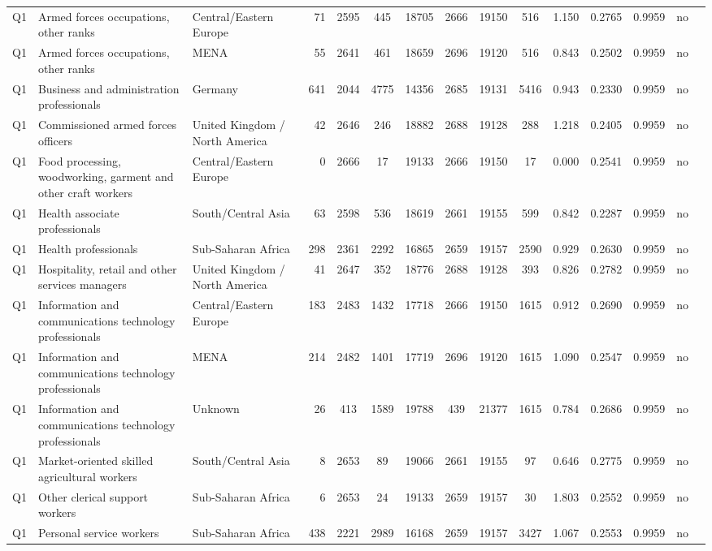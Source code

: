 \begin{longtable}{lllrcccccccccll}
Q1 & Armed forces occupations, other ranks & Central/Eastern Europe & 71 & 2595 & 445 & 18705 & 2666 & 19150 & 516 & 1.150 & 0.2765 & 0.9959 & no \\
Q1 & Armed forces occupations, other ranks & MENA & 55 & 2641 & 461 & 18659 & 2696 & 19120 & 516 & 0.843 & 0.2502 & 0.9959 & no \\
Q1 & Business and administration professionals & Germany & 641 & 2044 & 4775 & 14356 & 2685 & 19131 & 5416 & 0.943 & 0.2330 & 0.9959 & no \\
Q1 & Commissioned armed forces officers & United Kingdom / North America & 42 & 2646 & 246 & 18882 & 2688 & 19128 & 288 & 1.218 & 0.2405 & 0.9959 & no \\
Q1 & Food processing, woodworking, garment and other craft workers & Central/Eastern Europe & 0 & 2666 & 17 & 19133 & 2666 & 19150 & 17 & 0.000 & 0.2541 & 0.9959 & no \\
Q1 & Health associate professionals & South/Central Asia & 63 & 2598 & 536 & 18619 & 2661 & 19155 & 599 & 0.842 & 0.2287 & 0.9959 & no \\
Q1 & Health professionals & Sub-Saharan Africa & 298 & 2361 & 2292 & 16865 & 2659 & 19157 & 2590 & 0.929 & 0.2630 & 0.9959 & no \\
Q1 & Hospitality, retail and other services managers & United Kingdom / North America & 41 & 2647 & 352 & 18776 & 2688 & 19128 & 393 & 0.826 & 0.2782 & 0.9959 & no \\
Q1 & Information and communications technology professionals & Central/Eastern Europe & 183 & 2483 & 1432 & 17718 & 2666 & 19150 & 1615 & 0.912 & 0.2690 & 0.9959 & no \\
Q1 & Information and communications technology professionals & MENA & 214 & 2482 & 1401 & 17719 & 2696 & 19120 & 1615 & 1.090 & 0.2547 & 0.9959 & no \\
Q1 & Information and communications technology professionals & Unknown & 26 & 413 & 1589 & 19788 & 439 & 21377 & 1615 & 0.784 & 0.2686 & 0.9959 & no \\
Q1 & Market-oriented skilled agricultural workers & South/Central Asia & 8 & 2653 & 89 & 19066 & 2661 & 19155 & 97 & 0.646 & 0.2775 & 0.9959 & no \\
Q1 & Other clerical support workers & Sub-Saharan Africa & 6 & 2653 & 24 & 19133 & 2659 & 19157 & 30 & 1.803 & 0.2552 & 0.9959 & no \\
Q1 & Personal service workers & Sub-Saharan Africa & 438 & 2221 & 2989 & 16168 & 2659 & 19157 & 3427 & 1.067 & 0.2553 & 0.9959 & no \\

\end{longtable}

